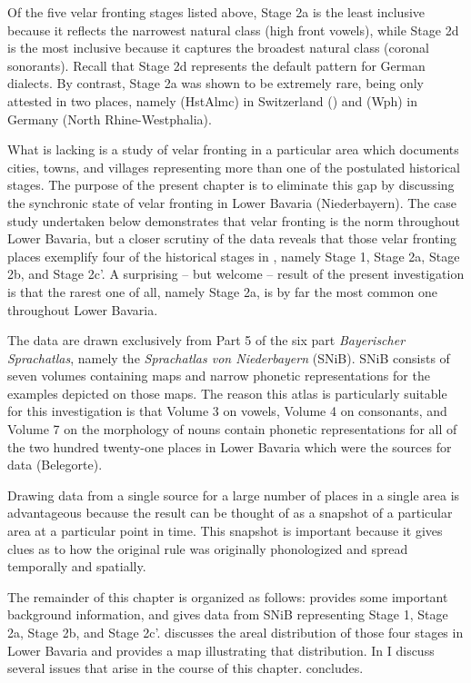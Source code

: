 Of the five velar fronting stages listed above, Stage 2a is the least inclusive because it reflects the narrowest natural class (high front vowels), while Stage 2d is the most inclusive because it captures the broadest natural class (coronal sonorants). Recall that Stage 2d represents the default pattern for German dialects. By contrast, Stage 2a was shown to be extremely rare, being only attested in two places, namely  (HstAlmc) in Switzerland () and  (Wph) in Germany (North Rhine-Westphalia).

What is lacking is a study of velar fronting in a particular area which documents cities, towns, and villages representing more than one of the postulated historical stages. The purpose of the present chapter is to eliminate this gap by discussing the synchronic state of velar fronting in Lower Bavaria (Niederbayern). The case study undertaken below demonstrates that velar fronting is the norm throughout Lower Bavaria, but a closer scrutiny of the data reveals that those velar fronting places exemplify four of the historical stages in , namely Stage 1, Stage 2a, Stage 2b, and Stage 2c'. A surprising -- but welcome -- result of the present investigation is that the rarest one of all, namely Stage 2a, is by far the most common one throughout Lower Bavaria.

The data are drawn exclusively from Part 5 of the six part \textit{Bayerischer Sprachatlas}, namely the \textit{Sprachatlas von Niederbayern} (SNiB). SNiB consists of seven volumes containing maps and narrow phonetic representations for the examples depicted on those maps. The reason this atlas is particularly suitable for this investigation is that Volume 3 on vowels, Volume 4 on consonants, and Volume 7 on the morphology of nouns contain phonetic representations for all of the two hundred twenty-one places in Lower Bavaria which were the sources for data (Belegorte).

Drawing data from a single source for a large number of places in a single area is advantageous because the result can be thought of as a snapshot of a particular area at a particular point in time. This snapshot is important because it gives clues as to how the original rule was originally phonologized and spread temporally and spatially.

The remainder of this chapter is organized as follows:  provides some important background information, and  gives data from SNiB representing Stage 1, Stage 2a, Stage 2b, and Stage 2c'.  discusses the areal distribution of those four stages in Lower Bavaria and provides a map illustrating that distribution. In  I discuss several issues that arise in the course of this chapter.  concludes.

